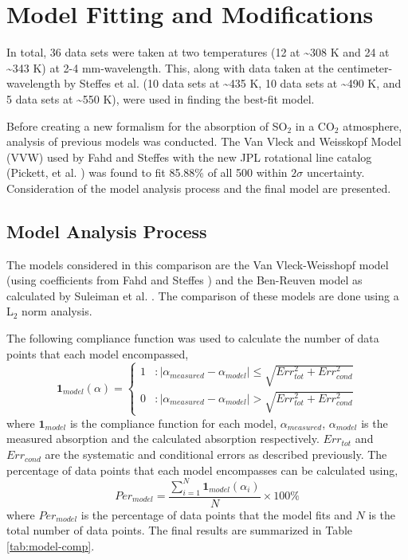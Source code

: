 \chapter{Model Fitting and Modifications}
In total, 36 data sets were taken at two temperatures (12 at \textasciitilde 308 K and 24 at \textasciitilde 343 K) at 2-4 mm-wavelength. This, along with data taken at the centimeter-wavelength by Steffes et al. \cite{Steffes-2014}(10 data sets at \textasciitilde 435 K, 10 data sets at \textasciitilde 490 K, and 5 data sets at \textasciitilde 550 K), were used in finding the best-fit model.

Before creating a new formalism for the absorption of SO$_2$ in a CO$_2$ atmosphere, analysis of previous models was conducted. The Van Vleck and Weisskopf Model (VVW) used by Fahd and Steffes \cite{Fahd-1991} with the new JPL rotational line catalog (Pickett, et al. \cite{Pickett-1998}) was found to fit 85.88\% of all 500 within $2\sigma$ uncertainty. Consideration of the model analysis process and the final model are presented.


\section{Model Analysis Process}

The models considered in this comparison are the Van Vleck-Weisshopf model (using coefficients from Fahd and Steffes \cite{Fahd-1991}) and the Ben-Reuven model as calculated by Suleiman et al. \cite{Suleiman-1996}. The comparison of these models are done using a L$_2$ norm analysis. 

The following compliance function was used to calculate the number of data points that each model encompassed,
\begin{equation}
\textbf{1}_{model}(\alpha) = \left\{
     \begin{array}{lr}
       1 & : |\alpha_{measured} - \alpha_{model}| \leq \sqrt{Err_{tot}^2 + Err_{cond}^2 }\\
       0 & : |\alpha_{measured} - \alpha_{model}| > \sqrt{Err_{tot}^2 + Err_{cond}^2 }
     \end{array}
   \right.
\end{equation}
where $\textbf{1}_{model}$ is the compliance function for each model, $\alpha_{measured}$, $\alpha_{model}$ is the measured absorption and the calculated absorption respectively. $Err_{tot}$ and $Err_{cond}$ are the systematic and conditional errors as described previously. The percentage of data points that each model encompasses can be calculated using,
\begin{equation}
Per_{model} = \frac{\sum_{i=1}^N \textbf{1}_{model}(\alpha_i)}{N}\times 100\%
\end{equation}
where $Per_{model}$ is the percentage of data points that the model fits and $N$ is the total number of data points. The final results are summarized in Table \ref{tab:model-comp}.


